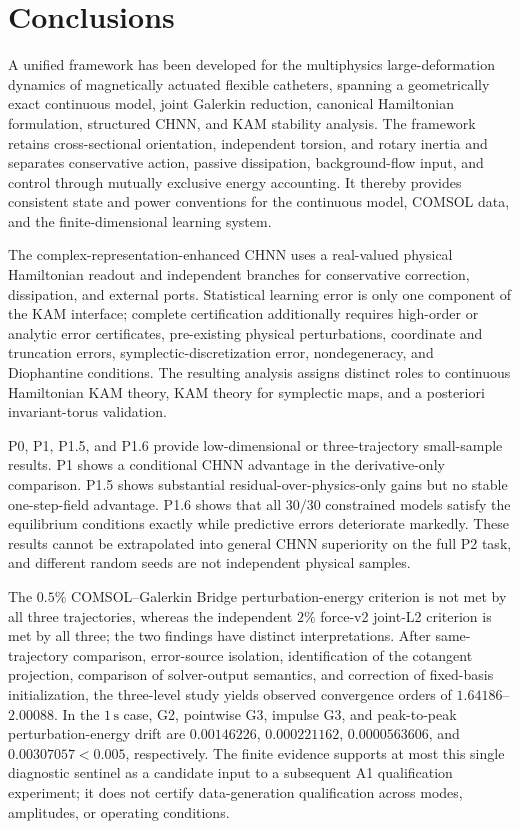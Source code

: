 \section{Conclusions}\label{sec:conclusion}

A unified framework has been developed for the multiphysics large-deformation dynamics of magnetically actuated flexible catheters, spanning a geometrically exact continuous model, joint Galerkin reduction, canonical Hamiltonian formulation, structured CHNN, and KAM stability analysis. The framework retains cross-sectional orientation, independent torsion, and rotary inertia and separates conservative action, passive dissipation, background-flow input, and control through mutually exclusive energy accounting. It thereby provides consistent state and power conventions for the continuous model, COMSOL data, and the finite-dimensional learning system.

The complex-representation-enhanced CHNN uses a real-valued physical Hamiltonian readout and independent branches for conservative correction, dissipation, and external ports. Statistical learning error is only one component of the KAM interface; complete certification additionally requires high-order or analytic error certificates, pre-existing physical perturbations, coordinate and truncation errors, symplectic-discretization error, nondegeneracy, and Diophantine conditions. The resulting analysis assigns distinct roles to continuous Hamiltonian KAM theory, KAM theory for symplectic maps, and a posteriori invariant-torus validation.

P0, P1, P1.5, and P1.6 provide low-dimensional or three-trajectory small-sample results. P1 shows a conditional CHNN advantage in the derivative-only comparison. P1.5 shows substantial residual-over-physics-only gains but no stable one-step-field advantage. P1.6 shows that all \(30/30\) constrained models satisfy the equilibrium conditions exactly while predictive errors deteriorate markedly. These results cannot be extrapolated into general CHNN superiority on the full P2 task, and different random seeds are not independent physical samples.

The \(0.5\%\) COMSOL--Galerkin Bridge perturbation-energy criterion is not met by all three trajectories, whereas the independent \(2\%\) force-v2 joint-L2 criterion is met by all three; the two findings have distinct interpretations. After same-trajectory comparison, error-source isolation, identification of the cotangent projection, comparison of solver-output semantics, and correction of fixed-basis initialization, the three-level study yields observed convergence orders of \(1.64186\)--\(2.00088\). In the \(1\,\mathrm{s}\) case, G2, pointwise G3, impulse G3, and peak-to-peak perturbation-energy drift are \(0.00146226\), \(0.000221162\), \(0.0000563606\), and \(0.00307057<0.005\), respectively. The finite evidence supports at most this single diagnostic sentinel as a candidate input to a subsequent A1 qualification experiment; it does not certify data-generation qualification across modes, amplitudes, or operating conditions.

